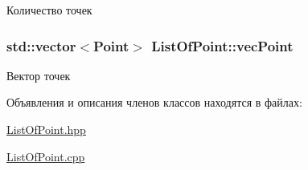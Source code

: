 Количество точек 

\subsubsection[{\texorpdfstring{vec\+Point}{vecPoint}}]{\setlength{\rightskip}{0pt plus 5cm}std\+::vector$<${\bf Point}$>$ List\+Of\+Point\+::vec\+Point\hspace{0.3cm}{\ttfamily [private]}}\hypertarget{class_list_of_point_a546103de5b7156b63dc985255bd55583}{}\label{class_list_of_point_a546103de5b7156b63dc985255bd55583}


Вектор точек 



Объявления и описания членов классов находятся в файлах\+:\begin{DoxyCompactItemize}
\item 
\hyperlink{_list_of_point_8hpp}{List\+Of\+Point.\+hpp}\item 
\hyperlink{_list_of_point_8cpp}{List\+Of\+Point.\+cpp}\end{DoxyCompactItemize}
